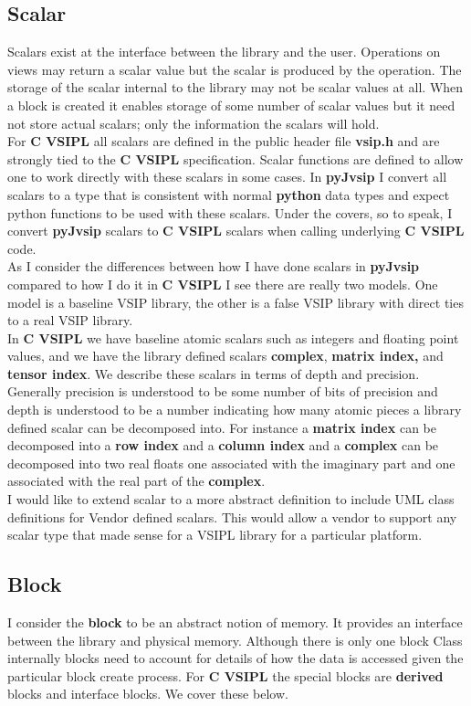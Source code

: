 \documentclass[11pt, oneside]{article}
\newcommand{\cvl}{\ttbf{C VSIPL}}
\newcommand{\pyjv}{{\ttbf{pyJvsip}}}
\newcommand{\ttbf}[1]{{\ttfamily \bfseries #1}}
\newcommand{\blk}{\ttbf{block}}
\begin{document}
\subsection{Scalar}
Scalars exist at the interface between the library and the user. Operations on views may return a scalar value but the scalar is produced by the operation.  The storage of the scalar internal to the library may not be scalar values at all.  When a block is created it enables storage of some number of scalar values but it need not store actual scalars; only the information the scalars will hold.
\\[6pt] 
For \cvl{} all scalars are defined in the public header file \ttbf{vsip.h} and are strongly tied to the \cvl{} specification. Scalar functions are defined to allow one to work directly with these scalars in some cases.  In \pyjv{} I convert all scalars to a type that is consistent with normal \ttbf{python} data types and expect python functions to be used with these scalars. Under the covers, so to speak, I convert \pyjv{} scalars to \cvl{} scalars when calling underlying \cvl{} code.
\\[6pt]
As I consider the differences between how I have done scalars in \pyjv{} compared to how I do it in \cvl{} I see there are really two models.  One model is a baseline VSIP library, the other is a false VSIP library with direct ties to a real VSIP library. 
\\[6pt]
In \cvl{} we have baseline atomic scalars such as integers and floating point values, and we have the library defined scalars \ttbf{complex}, \ttbf{matrix index,} and \ttbf{tensor index}.  We describe these scalars in terms of depth and precision. Generally precision is understood to be some number of bits of precision and depth is understood to be a number indicating how many atomic pieces a library defined scalar can be decomposed into. For instance a \ttbf{matrix index} can be decomposed into a \ttbf{row index} and a \ttbf{column index} and a \ttbf{complex} can be decomposed into two real floats one associated with the imaginary part  and one associated with the real part of the \ttbf{complex}.
\\[6pt]
I would like to extend scalar to a more abstract definition to include UML class definitions for Vendor defined scalars. This would allow a vendor to support any scalar type that made sense for a VSIPL library for a particular platform.
\subsection{Block}
I consider the \blk{} to be an abstract notion of memory. It provides an interface between the library and  physical memory.  Although there is only one block Class internally blocks need to account for details of how the data is accessed given the particular block create process. For \cvl{} the special blocks are \ttbf{derived} blocks and interface blocks.  We cover these below. 
\end{document}
